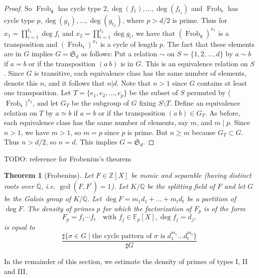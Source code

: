 \documentclass[11pt]{article}
\theoremstyle{plain}
\newtheorem{theorem}{Theorem}[section]
\theoremstyle{definition}
\theoremstyle{remark}
\numberwithin{equation}{section}
\numberwithin{table}{section}
\newcommand{\ZZ}{\mathbb{Z}}
\newcommand{\FF}{\mathbb{F}}
\newcommand{\QQ}{\mathbb{Q}}
\renewcommand{\SS}{\mathfrak{S}}
\newcommand{\Frob}{\operatorname{Frob}}
\begin{document}
\begin{proof}
  So $\Frob_{\mathfrak{q}}$ has cycle type $2,\deg(f_1),\ldots,\deg(f_{t_1})$ and
  $\Frob_{\mathfrak{r}}$ has cycle type $p,\deg(g_1),\ldots,\deg(g_{t_2})$, where 
  $p>d/2$ is prime. Thus for $x_1=\prod_{i=1}^{t_1}\deg f_i$ and $x_2=\prod_{i=1}^{t_2}\deg g_i$,
  we have that $(\Frob_{\mathfrak{q}})^{x_1}$ is a transposition and 
  $(\Frob_{\mathfrak{r}})^{x_2}$
  is a cycle of length $p$. The fact that these elements are in $G$ implies $G=\SS_d$ as follows:
  Put a relation $\sim$ on $S=\{1,2,\ldots,d\}$ by $a\sim b$ if $a=b$ or if the
  transposition $(a~b)$ is in $G$. This is an equivalence relation on $S$. Since $G$ is
  transitive, each equivalence class has the same number of elements, denote this
  $n$, and it follows that $n|d$. Note that $n>1$ since $G$ contains at least one
  transposition. Let $T=\{e_1,e_2,\ldots,e_p\}$ be the subset of $S$ permuted by
  ($\Frob_{\mathfrak{r}})^{x_2}$, and let $G_T$ be the subgroup of $G$ fixing $S\setminus T$.
  Define an equivalence relation on $T$ by $a\simeq b$ if $a=b$ or if the transposition
  $(a~b) \in G_T$. As before, each equivalence class has the same number of elements,
  say $m$, and $m\mid p$. Since $n>1$, we have $m>1$, so $m=p$ since $p$ is prime.
  But $n\geq m$ because $G_T\subset G$. Thus $n>d/2$, so $n=d$. This implies $G=\SS_d$. 
\end{proof}

TODO: reference for Frobenius's theorem

\begin{theorem}[Frobenius]\label{thm:frobenius}
  Let $F\in\ZZ[X]$ be monic and separable (having distinct roots over
  $\overline{\QQ}$, i.e. $\gcd(F, F^\prime)=1$).  Let $K/\QQ$ be the splitting
  field of $F$ and let $G$ be the Galois group of $K/\QQ$.  
  Let $\deg F=m_1d_1+\ldots+m_td_t$ be a partition of $\deg F$.  
  The density of primes $p$ for which the factorization of $F_p$ is of the
  form
  \begin{equation*}
    F_p=f_1\cdots f_t\quad\text{with }f_j\in\FF_p[X], \deg f_j=d_j,
  \end{equation*}
  is equal to
  \begin{equation*}
    \frac{\sharp\{\sigma\in G\mid\text{the cycle pattern of $\sigma$ is 
    $d_1^{m_1}\ldots d_t^{m_t}$}\}
    }{\sharp G}
  \end{equation*}
\end{theorem}

In the remainder of this section, we estimate the density of primes of types
I, II and III.
\end{document}

